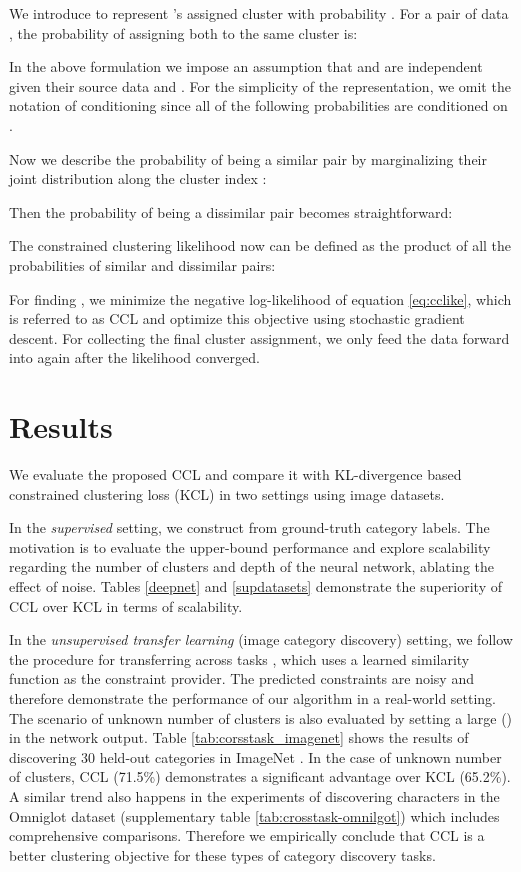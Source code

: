 \documentclass[10pt,twocolumn,letterpaper]{article}
\begin{document}
We introduce  to represent 's assigned cluster with probability . For a pair of data , the probability of assigning both to the same cluster  is:

In the above formulation we impose an assumption that  and  are independent given their source data  and . For the simplicity of the representation, we omit the notation of conditioning since all of the following probabilities are conditioned on .

Now we describe the probability of  being a similar pair by marginalizing their joint distribution along the cluster index :

Then the probability of  being a dissimilar pair becomes straightforward:

The constrained clustering likelihood  now can be defined as the product of all the probabilities of similar and dissimilar pairs:

For finding , we minimize the negative log-likelihood of equation \eqref{eq:cclike}, which is referred to as CCL and optimize this objective using stochastic gradient descent. For collecting the final cluster assignment, we only feed the data forward into  again after the likelihood converged.

\section{Results}
We evaluate the proposed CCL and compare it with KL-divergence based constrained clustering loss (KCL) \cite{Hsu16iclrw,Hsu18iclr} in two settings using image datasets.

In the \emph{supervised} setting, we construct  from ground-truth category labels. The motivation is to evaluate the upper-bound performance and explore scalability regarding the number of clusters and depth of the neural network, ablating the effect of noise. Tables \ref{deepnet} and \ref{supdatasets} demonstrate the superiority of CCL over KCL in terms of scalability. 

In the \emph{unsupervised transfer learning} (\ie image category discovery) setting, we follow the procedure for transferring across tasks \cite{Hsu18iclr}, which uses a learned similarity function as the constraint provider. The predicted constraints are noisy and therefore demonstrate the performance of our algorithm in a real-world setting. The scenario of unknown number of clusters is also evaluated by setting a large  () in the network output. Table \ref{tab:corsstask_imagenet} shows the results of discovering 30 held-out categories in ImageNet \cite{deng2019imagenet}. In the case of unknown number of clusters, CCL (71.5\%) demonstrates a significant advantage over KCL (65.2\%). A similar trend also happens in the experiments of discovering characters in the Omniglot dataset (supplementary table \ref{tab:crosstask-omnilgot}) which includes comprehensive comparisons. Therefore we empirically conclude that CCL is a better clustering objective for these types of category discovery tasks.
\end{document}
